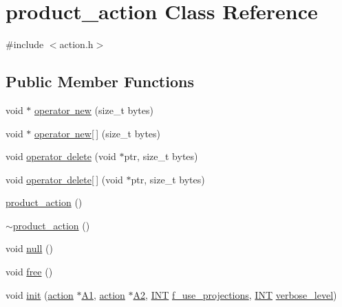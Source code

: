 \hypertarget{classproduct__action}{}\section{product\+\_\+action Class Reference}
\label{classproduct__action}


{\ttfamily \#include $<$action.\+h$>$}

\subsection*{Public Member Functions}
\begin{DoxyCompactItemize}
\item 
void $\ast$ \mbox{\hyperlink{classproduct__action_a6159036a9eb9bcbbbe29cf476f1ed66f}{operator new}} (size\+\_\+t bytes)
\item 
void $\ast$ \mbox{\hyperlink{classproduct__action_a94963beab8d937869d5b8f1bcbdbe2b8}{operator new\mbox{[}$\,$\mbox{]}}} (size\+\_\+t bytes)
\item 
void \mbox{\hyperlink{classproduct__action_a576a86e22cae457ec3b34f5f7e927d13}{operator delete}} (void $\ast$ptr, size\+\_\+t bytes)
\item 
void \mbox{\hyperlink{classproduct__action_af67890630daacde603c8a369c41434b0}{operator delete\mbox{[}$\,$\mbox{]}}} (void $\ast$ptr, size\+\_\+t bytes)
\item 
\mbox{\hyperlink{classproduct__action_abdcf790efa2de925d1ba0eef9848b262}{product\+\_\+action}} ()
\item 
\mbox{\hyperlink{classproduct__action_aa5fb126203c10f2559805ff1567d2dbc}{$\sim$product\+\_\+action}} ()
\item 
void \mbox{\hyperlink{classproduct__action_a5a8a4c983398ab1ff4fcd6bd30d17a31}{null}} ()
\item 
void \mbox{\hyperlink{classproduct__action_afa357e78243f8b567d117f6e37ab037e}{free}} ()
\item 
void \mbox{\hyperlink{classproduct__action_a3a84ca69f8b7e903eac0dd787cfa1cf9}{init}} (\mbox{\hyperlink{classaction}{action}} $\ast$\mbox{\hyperlink{classproduct__action_a04d3b3147350bc8abafa2011979d36be}{A1}}, \mbox{\hyperlink{classaction}{action}} $\ast$\mbox{\hyperlink{classproduct__action_a55e81e988b24be63adb758016760af3e}{A2}}, \mbox{\hyperlink{galois_8h_a09fddde158a3a20bd2dcadb609de11dc}{I\+NT}} \mbox{\hyperlink{classproduct__action_ac2cdcc17f994aa2b9022e043120fb192}{f\+\_\+use\+\_\+projections}}, \mbox{\hyperlink{galois_8h_a09fddde158a3a20bd2dcadb609de11dc}{I\+NT}} \mbox{\hyperlink{simeon_8_c_a818073fbcc2f439e7c56952f67386122}{verbose\+\_\+level}})

\end{DoxyCompactItemize}
